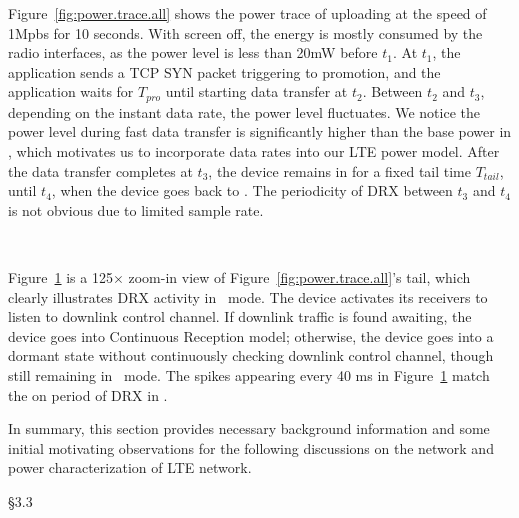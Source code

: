 Figure~\ref{fig:power.trace.all} shows the power trace of uploading at the speed of 1Mpbs for 10 seconds. With screen off, the energy is mostly consumed by the radio interfaces, as the power level is less than 20mW before $t_1$. At $t_1$, the application sends a TCP {\sf SYN} packet triggering \RI to \RC promotion, and the application waits for $T_{pro}$ until starting data transfer at $t_2$. Between $t_2$ and $t_3$, depending on the instant data rate, the power level fluctuates. We notice the power level during fast data transfer is significantly higher than the base power in \RC, which motivates us to incorporate data rates into our LTE power model. After the data transfer completes at $t_3$, the device remains in \RC for a fixed tail time $T_{tail}$, until $t_4$, when the device goes back to \RI. The periodicity of DRX between $t_3$ and $t_4$ is not obvious due to limited sample rate.


\begin{figure}[h]
\centering
{} \\
\label{fig:power.trace.zoom}
\end{figure}

Figure~\ref{fig:power.trace.zoom} is a 125$\times$ zoom-in view of Figure~\ref{fig:power.trace.all}'s tail, which clearly illustrates DRX activity in \RC~mode. The device activates its receivers to listen to downlink control channel. If downlink traffic is found awaiting, the device goes into Continuous Reception model; otherwise, the device goes into a dormant state without continuously checking downlink control channel, though still remaining in \RC~mode. The spikes appearing every 40 ms in Figure~\ref{fig:power.trace.zoom} match the on period of DRX in \RC.

In summary, this section provides necessary background information and some initial motivating observations for the following discussions on the network and power characterization of LTE network.






\S3.3

